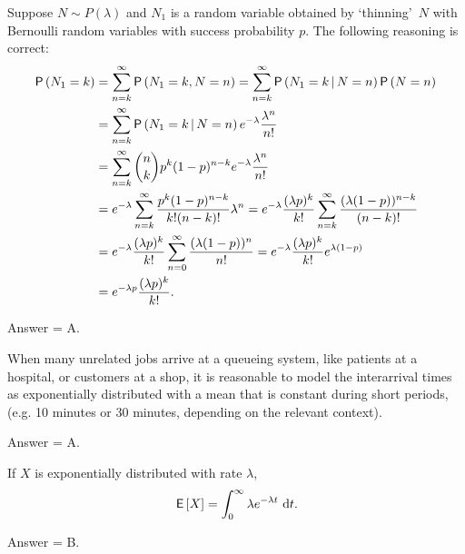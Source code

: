 \begin{exercise}[201802]
Suppose $N\sim P(\lambda)$ and $N_1$ is a random variable obtained by `thinning'~$N$ with Bernoulli random variables with success probability $p$. The following reasoning is correct:
\begin{equation*}
  \begin{split}
    \P{N_1 = k}
&= \sum_{n=k}^\infty \P{N_1 =k, N = n} 
= \sum_{n=k}^\infty \P{N_1 =k\given N = n}\P{N=n} \\
&= \sum_{n=k}^\infty \P{N_1 =k\given N = n}e^{-\lambda} \frac{\lambda^n}{n!}\\
&= \sum_{n=k}^\infty {n \choose k} p^k (1-p)^{n-k} e^{-\lambda} \frac{\lambda^n}{n!} \\
&= e^{-\lambda}\sum_{n=k}^\infty  \frac{p^k (1-p)^{n-k}}{k! (n-k)!} \lambda^n
= e^{-\lambda} \frac{(\lambda p)^k}{k!} \sum_{n=k}^\infty  \frac{(\lambda (1-p))^{n-k}}{(n-k)!}\\
&= e^{-\lambda} \frac{(\lambda p)^k}{k!} \sum_{n=0}^\infty  \frac{(\lambda (1-p))^{n}}{n!}
= e^{-\lambda} \frac{(\lambda p)^k}{k!} e^{\lambda(1-p)} \\
&= e^{-\lambda p} \frac{(\lambda p)^k}{k!}.
  \end{split}
\end{equation*}
\begin{solution}
Answer = A.
\end{solution}
\end{exercise}

\begin{exercise}[201802]
When many unrelated jobs arrive at a queueing system, like patients at a hospital, or customers at a shop, it is reasonable to model the interarrival times as exponentially distributed with a mean that is constant during short periods, (e.g. 10 minutes or 30 minutes, depending on the relevant context). 
\begin{solution}
Answer = A.
\end{solution}
\end{exercise}

\begin{exercise}[201802]
If $X$ is exponentially distributed with rate $\lambda$,
 \begin{equation*}
    \,\mathsf{E}\left[X\right] = \int_0^\infty \lambda e^{-\lambda t}\, \,\text{d}t.
  \end{equation*}
\begin{solution}
Answer = B.
\end{solution}
\end{exercise}

